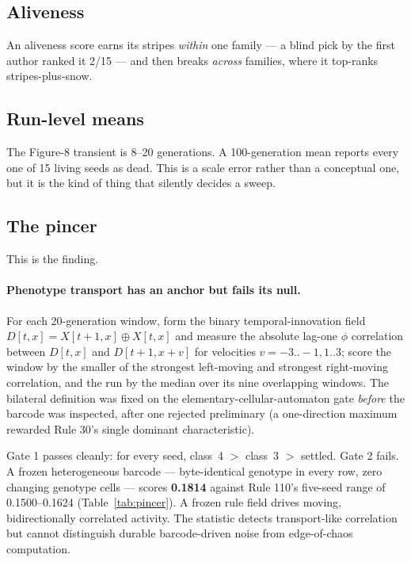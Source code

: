 \documentclass[man,12pt,floatsintext]{apa7}
\begin{document}
\subsection{Aliveness}

An aliveness score earns its stripes \emph{within} one family --- a blind
pick by the first author ranked it 2/15 --- and then breaks \emph{across}
families, where it top-ranks stripes-plus-snow.

\subsection{Run-level means}

The Figure-8 transient is 8--20 generations. A 100-generation mean reports
every one of 15 living seeds as dead. This is a scale error rather than a
conceptual one, but it is the kind of thing that silently decides a
sweep.

\subsection{The pincer}
\label{sec:pincer}

This is the finding.

\paragraph{Phenotype transport has an anchor but fails its null.}
For each 20-generation window, form the binary temporal-innovation field
$D[t,x] = X[t{+}1,x] \oplus X[t,x]$ and measure the absolute lag-one $\phi$
correlation between $D[t,x]$ and $D[t{+}1,x{+}v]$ for velocities
$v = -3..-1, 1..3$; score the window by the smaller of the strongest
left-moving and strongest right-moving correlation, and the run by the
median over its nine overlapping windows. The bilateral definition was
fixed on the elementary-cellular-automaton gate \emph{before} the barcode
was inspected, after one rejected preliminary (a one-direction maximum
rewarded Rule 30's single dominant characteristic).

Gate 1 passes cleanly: for every seed, class~4 $>$ class~3 $>$ settled.
Gate 2 fails. A frozen heterogeneous barcode --- byte-identical genotype in
every row, zero changing genotype cells --- scores \textbf{0.1814} against
Rule 110's five-seed range of 0.1500--0.1624
(Table~\ref{tab:pincer}). A frozen rule field drives moving,
bidirectionally correlated activity. The statistic detects transport-like
correlation but cannot distinguish durable barcode-driven noise from
edge-of-chaos computation.
\end{document}
